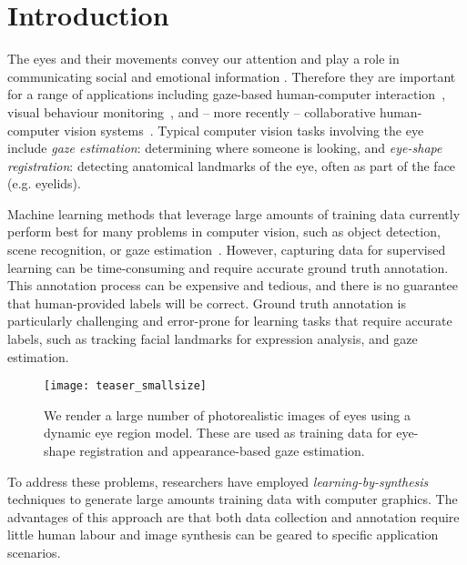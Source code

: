
\section{Introduction}

The eyes and their movements convey our attention and play a role in communicating social and emotional information \cite{Argyle1965}.
Therefore they are important for a range of applications including gaze-based human-computer interaction~\cite{majaranta14_apc}, visual behaviour monitoring~\cite{bulling11_pami}, and -- more recently -- collaborative human-computer vision systems~\cite{yun2013studying,papadopoulos2014training,sattar15_cvpr}. 
Typical computer vision tasks involving the eye include \emph{gaze estimation}: determining where someone is looking, and \emph{eye-shape registration}: detecting anatomical landmarks of the eye, often as part of the face (e.g. eyelids).

Machine learning methods that leverage large amounts of training data currently perform best for many problems in computer vision, such as object detection, scene recognition, or gaze estimation~\cite{zhou2014learning,girshick2014rich,zhang15_cvpr}.
However, capturing data for supervised learning can be time-consuming and require accurate ground truth annotation.
This annotation process can be expensive and tedious, and there is no guarantee that human-provided labels will be correct.
Ground truth annotation is particularly challenging and error-prone for learning tasks that require accurate labels, such as tracking facial landmarks for expression analysis, and gaze estimation.

\begin{figure}
    \texttt{[image: teaser\_smallsize]}
    \caption{We render a large number of photorealistic images of eyes using a dynamic eye region model. These are used as training data for eye-shape registration and appearance-based gaze estimation.}
    \label{fig:teaser}
\end{figure}

To address these problems, researchers have employed \emph{learning-by-synthesis} techniques to generate large amounts training data with computer graphics.
The advantages of this approach are that both data collection and annotation require little human labour and image synthesis can be geared to specific application scenarios.

